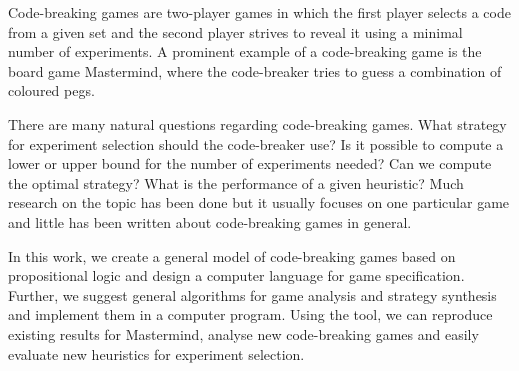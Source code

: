 \begin{ThesisAbstract}
Code-breaking games are two-player games in which the first player selects
  a code from a given set and the second player strives to reveal it using a
  minimal number of experiments.
A prominent example of a code-breaking game is the board game Mastermind,
  where the code-breaker tries to guess a combination of coloured pegs.

There are many natural questions regarding code-breaking games.
What strategy for experiment selection should the code-breaker use?
Is it possible to compute a lower or upper bound for the number of experiments needed?
Can we compute the optimal strategy?
What is the performance of a given heuristic?
Much research on the topic has been done but it usually focuses
  on one particular game and little has been written about code-breaking
  games in general.

In this work, we create a general model of code-breaking games
  based on propositional logic
  and design a computer language for game specification.
Further, we suggest general algorithms for game analysis and strategy synthesis
  and implement them in a computer program.
Using the tool, we can reproduce existing results for Mastermind,
  analyse new code-breaking games and easily evaluate new heuristics
  for experiment selection.
\end{ThesisAbstract}

\MainMatter
\setlength{\parindent}{0pt}

\setcounter{secnumdepth}{1}
\setcounter{tocdepth}{2}
\begin{spacing}{1.2} \normalsize
\tableofcontents
\end{spacing}










\pagestyle{plain}
\printbibliography
\clearpage
{}




